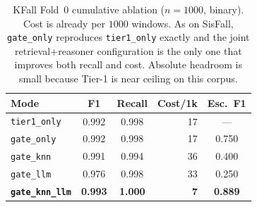 \begin{table}[!t]
\centering
\caption{KFall Fold~0 cumulative ablation ($n{=}1000$, binary). Cost is already per $1000$ windows. As on SisFall, \texttt{gate\_only} reproduces \texttt{tier1\_only} exactly and the joint retrieval$+$reasoner configuration is the only one that improves both recall and cost. Absolute headroom is small because Tier-1 is near ceiling on this corpus.}
\label{tab:kfallablation}
\begin{tabular}{lccrc}
\toprule
Mode & F1 & Recall & Cost/1k & Esc.\ F1 \\
\midrule
\texttt{tier1\_only} & 0.992 & 0.998 & 17 & --- \\
\texttt{gate\_only}  & 0.992 & 0.998 & 17 & 0.750 \\
\texttt{gate\_knn}   & 0.991 & 0.994 & 36 & 0.400 \\
\texttt{gate\_llm}   & 0.976 & 0.998 & 33 & 0.250 \\
\textbf{\texttt{gate\_knn\_llm}} & \textbf{0.993} & \textbf{1.000} & \textbf{7} & \textbf{0.889} \\
\bottomrule
\end{tabular}
\end{table}
